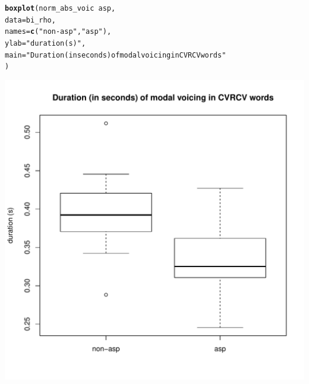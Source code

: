 \documentclass[a4paper,11pt]{article}\usepackage[]{graphicx}\usepackage[]{color}
\makeatletter
\def\maxwidth{ %
  \ifdim\Gin@nat@width>\linewidth
    \linewidth
  \else
    \Gin@nat@width
  \fi
}
\newcommand{\hlstr}[1]{\textcolor[rgb]{0.192,0.494,0.8}{#1}}%
\newcommand{\hlopt}[1]{\textcolor[rgb]{0,0,0}{#1}}%
\newcommand{\hlstd}[1]{\textcolor[rgb]{0.345,0.345,0.345}{#1}}%
\newcommand{\hlkwc}[1]{\textcolor[rgb]{0.333,0.667,0.333}{#1}}%
\newcommand{\hlkwd}[1]{\textcolor[rgb]{0.737,0.353,0.396}{\textbf{#1}}}%
\newenvironment{kframe}{%
 \def\at@end@of@kframe{}%
 \ifinner\ifhmode%
  \def\at@end@of@kframe{\end{minipage}}%
  \begin{minipage}{\columnwidth}%
 \fi\fi%
 \def\FrameCommand##1{\hskip\@totalleftmargin \hskip-\fboxsep
 \colorbox{shadecolor}{##1}\hskip-\fboxsep
     \hskip-\linewidth \hskip-\@totalleftmargin \hskip\columnwidth}%
 \MakeFramed {\advance\hsize-\width
   \@totalleftmargin\z@ \linewidth\hsize
   \@setminipage}}%
 {\par\unskip\endMakeFramed%
 \at@end@of@kframe}
\newenvironment{knitrout}{}{} %
\makeatother
\begin{document}
\begin{knitrout}
\color{fgcolor}\begin{kframe}
\begin{alltt}
\hlkwd{boxplot}\hlstd{(norm_abs_voic} \hlopt{~} \hlstd{asp,}
        \hlkwc{data} \hlstd{= bi_rho,}
        \hlkwc{names} \hlstd{=} \hlkwd{c}\hlstd{(}\hlstr{"non-asp"}\hlstd{,} \hlstr{"asp"}\hlstd{),}
        \hlkwc{ylab} \hlstd{=} \hlstr{"duration (s)"}\hlstd{,}
        \hlkwc{main} \hlstd{=} \hlstr{"Duration (in seconds) of modal voicing in CVRCV words"}
        \hlstd{)}
\end{alltt}
\end{kframe}

{\centering \includegraphics[width=\maxwidth]{img/bi-rho-box-1} 

}



\end{knitrout}
\end{document}
